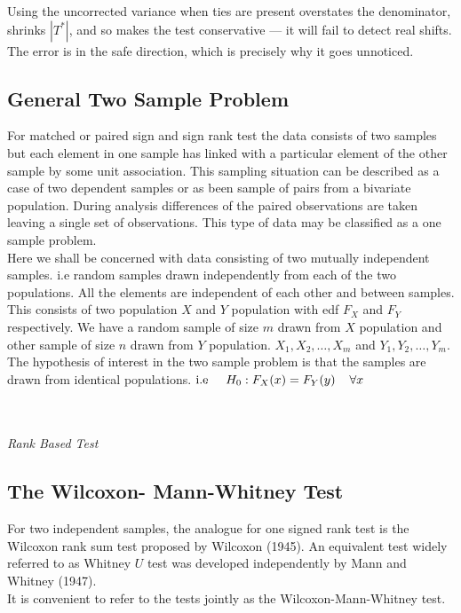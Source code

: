\documentclass[11pt,a4paper]{article}
\theoremstyle{definition}
\begin{document}
Using the uncorrected variance when ties are present overstates the denominator,
shrinks $\left|T^{*}\right|$, and so makes the test conservative --- it will fail
to detect real shifts. The error is in the safe direction, which is precisely why
it goes unnoticed.

\subsection{General Two Sample Problem}
For matched or paired sign and sign rank test the data consists of two samples but each element in one sample has linked  with a particular element of the other sample by some unit association. This sampling situation can be described as a case of two dependent samples or as been sample of pairs from a bivariate population. During analysis differences of the paired observations are taken leaving a single set of observations. This type of data may be classified as a one sample problem.\\ 
Here we shall be concerned with data consisting of two mutually independent samples. i.e random samples drawn independently from each of the two populations. All the elements are independent of each other and between samples. This consists of two population $X$ and $Y$ population with edf $F_X$ and $F_Y$ respectively. We have a random sample of size $m$ drawn from $X$ population and other sample of size $n$ drawn from $Y$ population. $X_1,X_2,\dots,X_m$ and $Y_1,Y_2,\dots,Y_m$. The hypothesis of interest in the two sample problem is that the samples are drawn from identical populations. \hspace{0.2cm}$\text{i.e}\hspace{0.5cm} H_0:F_X(x)=F_Y(y)\hspace{0.4cm}\forall x$\\\\\\






\begin{center}
\textit{Rank Based Test}
\end{center}
\vspace{0.3cm}
\subsection{The Wilcoxon- Mann-Whitney Test}
For two independent samples, the analogue for one signed rank test is the Wilcoxon rank sum test proposed by Wilcoxon (1945). An equivalent test widely referred to as Whitney $U$ test was developed independently by Mann and Whitney (1947).\\ It is convenient to refer to the tests jointly as the Wilcoxon-Mann-Whitney test.\\
\end{document}
